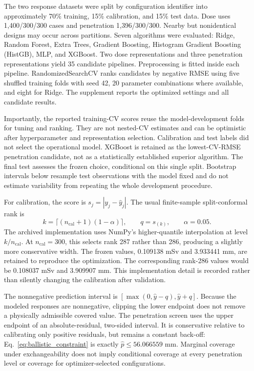 \documentclass[12pt]{elsarticle}
\begin{document}
The two response datasets were split by configuration identifier into approximately 70\% training, 15\% calibration, and 15\% test data. Dose uses 1,400/300/300 cases and penetration 1,396/300/300. Nearby but nonidentical designs may occur across partitions. Seven algorithms were evaluated: Ridge, Random Forest, Extra Trees, Gradient Boosting, Histogram Gradient Boosting (HistGB), MLP, and XGBoost. Two dose representations and three penetration representations yield 35 candidate pipelines. Preprocessing is fitted inside each pipeline. RandomizedSearchCV ranks candidates by negative RMSE using five shuffled training folds with seed 42, 20 parameter combinations where available, and eight for Ridge. The supplement reports the optimized settings and all candidate results.

Importantly, the reported training-CV scores reuse the model-development folds for tuning and ranking. They are not nested-CV estimates and can be optimistic after hyperparameter and representation selection. Calibration and test labels did not select the operational model. XGBoost is retained as the lowest-CV-RMSE penetration candidate, not as a statistically established superior algorithm. The final test assesses the frozen choice, conditional on this single split. Bootstrap intervals below resample test observations with the model fixed and do not estimate variability from repeating the whole development procedure.

For calibration, the score is $s_j=|y_j-\widehat y_j|$. The usual finite-sample split-conformal rank is
\begin{equation}
k=\lceil(n_{\mathrm{cal}}+1)(1-\alpha)\rceil,\qquad q=s_{(k)},\qquad\alpha=0.05.\label{eq:conformal}
\end{equation}
The archived implementation uses NumPy's higher-quantile interpolation at level $k/n_{\mathrm{cal}}$. At $n_{\mathrm{cal}}=300$, this selects rank 287 rather than 286, producing a slightly more conservative width. The frozen values, 0.109138 mSv and 3.933441 mm, are retained to reproduce the optimization. The corresponding rank-286 values would be 0.108037 mSv and 3.909907 mm. This implementation detail is recorded rather than silently changing the calibration after validation.

The nonnegative prediction interval is $[\max(0,\widehat y-q),\widehat y+q]$. Because the modeled responses are nonnegative, clipping the lower endpoint does not remove a physically admissible covered value. The penetration screen uses the upper endpoint of an absolute-residual, two-sided interval. It is conservative relative to calibrating only positive residuals, but remains a constant back-off: Eq.~\eqref{eq:ballistic_constraint} is exactly $\widehat p\leq56.066559$ mm. Marginal coverage under exchangeability does not imply conditional coverage at every penetration level or coverage for optimizer-selected configurations.
\end{document}
